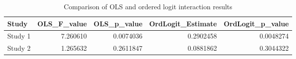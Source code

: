 \begin{table}

\caption{Comparison of OLS and ordered logit interaction results}
\centering
\begin{tabular}[t]{lrrrr}
\toprule
Study & OLS\_F\_value & OLS\_p\_value & OrdLogit\_Estimate & OrdLogit\_p\_value\\
\midrule
Study 1 & 7.260610 & 0.0074036 & 0.2902458 & 0.0048274\\
Study 2 & 1.265632 & 0.2611847 & 0.0881862 & 0.3044322\\
\bottomrule
\end{tabular}
\end{table}
